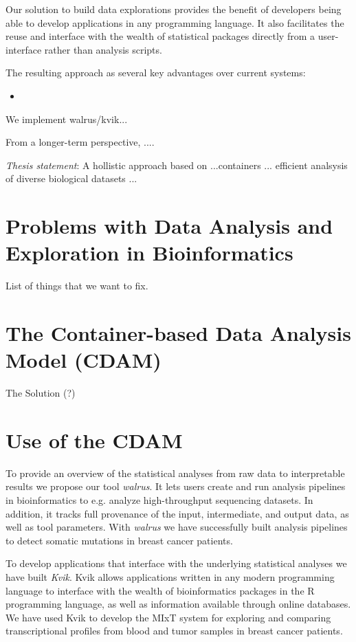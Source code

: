 Our solution to build data explorations provides the benefit of developers being
able to develop applications in any programming language. It also facilitates
the reuse and interface with the wealth of statistical packages directly from a
user-interface rather than analysis scripts. 

The resulting approach as several key advantages over current systems: 
\begin{itemize} 
    \item
\end{itemize} 

We implement walrus/kvik... 

From a longer-term perspective, ....

\emph{Thesis statement}:
A hollistic approach based on ...containers ... efficient analsysis of diverse
biological datasets ... 

\section{Problems with Data Analysis and Exploration in Bioinformatics} 
    List of things that we want to fix. 

\section{The Container-based Data Analysis Model (CDAM)} 
    The Solution (?) 

\section{Use of the CDAM} 

To provide an overview of the statistical analyses from raw data to
interpretable results we propose our tool \emph{walrus}. It lets users create
and run analysis pipelines in bioinformatics to e.g. analyze high-throughput
sequencing datasets. In addition, it tracks full provenance of the input,
intermediate, and output data, as well as tool parameters. With \emph{walrus} we
have successfully built analysis pipelines to detect somatic mutations in breast
cancer patients. 

To develop applications that interface with the underlying statistical analyses
we have built \emph{Kvik}. Kvik allows applications written in any modern
programming language to interface with the wealth of bioinformatics packages in
the R programming language, as well as information available through online
databases. We have used Kvik to develop the MIxT system for exploring and
comparing transcriptional profiles from blood and tumor samples in breast cancer
patients. 


